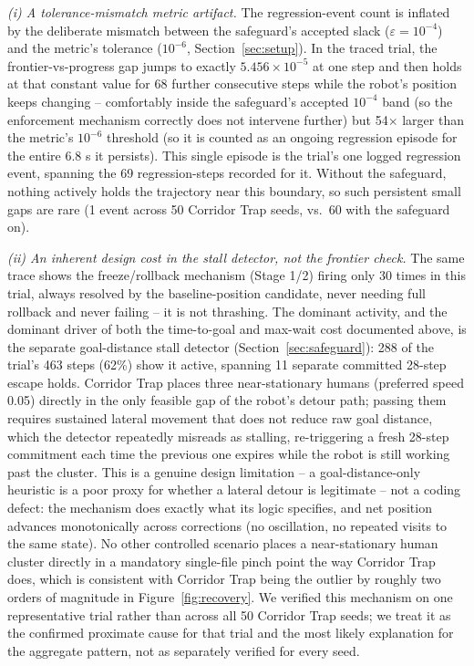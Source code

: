 \documentclass[conference,letterpaper,10pt]{ieeeconf}
\begin{document}
\emph{(i) A tolerance-mismatch metric artifact.} The regression-event
count is inflated by the deliberate mismatch between the safeguard's
accepted slack ($\varepsilon = 10^{-4}$) and the metric's tolerance
($10^{-6}$, Section~\ref{sec:setup}). In the traced trial, the
frontier-vs-progress gap jumps to exactly $5.456\times10^{-5}$ at one step
and then holds at that constant value for 68 further consecutive steps
while the robot's position keeps changing -- comfortably inside the
safeguard's accepted $10^{-4}$ band (so the enforcement mechanism
correctly does not intervene further) but 54$\times$ larger than the
metric's $10^{-6}$ threshold (so it is counted as an ongoing regression
episode for the entire 6.8 s it persists). This single episode is the
trial's one logged regression event, spanning the 69 regression-steps
recorded for it. Without the safeguard, nothing actively holds the
trajectory near this boundary, so such persistent small gaps are rare
(1 event across 50 Corridor Trap seeds, vs.\ 60 with the safeguard on).

\emph{(ii) An inherent design cost in the stall detector, not the
frontier check.} The same trace shows the freeze/rollback mechanism
(Stage 1/2) firing only 30 times in this trial, always resolved by the
baseline-position candidate, never needing full rollback and never
failing -- it is not thrashing. The dominant activity, and the dominant
driver of both the time-to-goal and max-wait cost documented above, is
the separate goal-distance stall detector (Section~\ref{sec:safeguard}):
288 of the trial's 463 steps (62\%) show it active, spanning 11 separate
committed 28-step escape holds. Corridor Trap places three near-stationary
humans (preferred speed 0.05) directly in the only feasible gap of the
robot's detour path; passing them requires sustained lateral movement that
does not reduce raw goal distance, which the detector repeatedly
misreads as stalling, re-triggering a fresh 28-step commitment each time
the previous one expires while the robot is still working past the
cluster. This is a genuine design limitation -- a goal-distance-only
heuristic is a poor proxy for whether a lateral detour is legitimate --
not a coding defect: the mechanism does exactly what its logic specifies,
and net position advances monotonically across corrections (no
oscillation, no repeated visits to the same state). No other controlled
scenario places a near-stationary human cluster directly in a mandatory
single-file pinch point the way Corridor Trap does, which is consistent
with Corridor Trap being the outlier by roughly two orders of magnitude in
Figure~\ref{fig:recovery}. We verified this mechanism on one representative
trial rather than across all 50 Corridor Trap seeds; we treat it as the
confirmed proximate cause for that trial and the most likely explanation
for the aggregate pattern, not as separately verified for every seed.
\end{document}
